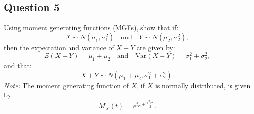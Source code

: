 \documentclass[12pt]{article}
\begin{document}
\newpage
\subsection*{Question 5}
Using moment generating functions (MGFs), show that if:
\[ X \sim N(\mu_1, \sigma_1^2) \quad \text{and} \quad Y \sim N(\mu_2, \sigma_2^2), \]
then the expectation and variance of \( X+Y \) are given by:
\[ E(X+Y) = \mu_1 + \mu_2 \quad \text{and} \quad \text{Var}(X+Y) = \sigma_1^2 + \sigma_2^2, \]
and that:
\[ X + Y \sim N(\mu_1 + \mu_2, \sigma_1^2 + \sigma_2^2). \]
\textit{Note:} The moment generating function of \( X \), if \( X \) is normally distributed, is given by:
\[ M_X(t) = e^{t\mu + \frac{t^2\sigma^2}{2}}. \]
\end{document}
